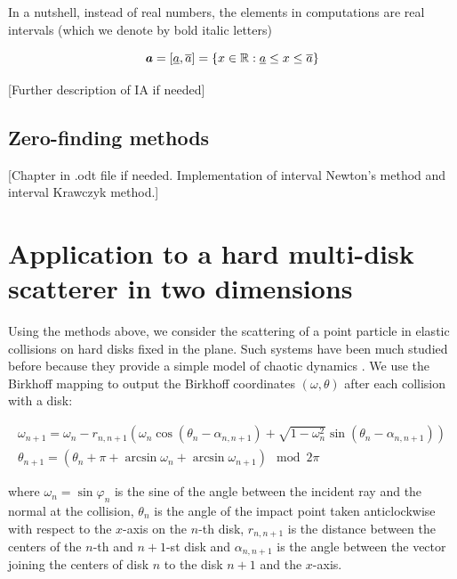 \documentclass[pre, amsmath, amssymb, onecolumn, showpacs]{revtex4-1}
\begin{document}
In a nutshell, instead of real numbers, the elements in computations are real intervals (which we denote by bold italic letters)

\begin{equation}
\textbf{\emph{a}} = [\underline{a}, \overline{a}] = \{x \in \mathbb{R}: \underline{a} \leq x \leq \overline{a}\}
\end{equation}


[Further description of IA if needed]


\subsection{Zero-finding methods}

[Chapter in .odt file if needed. Implementation of interval Newton's method and interval Krawczyk method.]

\section{Application to a hard multi-disk scatterer in two dimensions}

Using the methods above, we consider the scattering of a point particle in elastic collisions on hard disks fixed in the plane. Such systems have been much studied before because they provide a simple model of chaotic dynamics \cite{gaspard2005chaos, eckhardt1987fractal, jung1987cantor, gaspard1989scattering, gaspard1989semiclassical, gaspard1989exact, kovacs1990thermodynamics, korsch1991fractal}. We use the Birkhoff mapping \cite{gaspard2005chaos} to output the Birkhoff coordinates $(\omega, \theta)$ after each collision with a disk:

\begin{equation}
\begin{split}
\omega_{n+1} = \omega_n - r_{n, n+1} (\omega_n \cos(\theta_n - \alpha_{n, n+1}) + \sqrt{1 - \omega_n^2} \sin(\theta_n - \alpha_{n, n+1})) \\
\theta_{n+1} = (\theta_n + \pi + \arcsin \omega_n + \arcsin \omega_{n+1}) \mod 2 \pi
\end{split}
\end{equation}

where $\omega_n = \sin \varphi_n$ is the sine of the angle between the incident ray and the normal at the collision, $\theta_n$ is the angle of the impact point taken anticlockwise with respect to the $x$-axis on the $n$-th disk, $r_{n, n+1}$ is the distance between the centers of the $n$-th and $n+1$-st disk and $\alpha_{n, n+1}$ is the angle between the vector joining the centers of disk $n$ to the disk $n+1$ and the $x$-axis.
\end{document}

